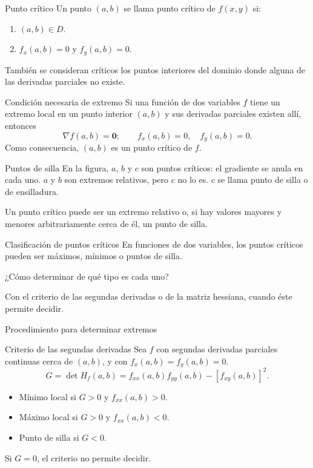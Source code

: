 \documentclass[main.tex]{subfiles}
\begin{document}
\begin{frame}{Punto crítico}
Un punto $(a,b)$ se llama punto crítico de $f(x,y)$ si:
\begin{enumerate}
\item $(a,b)\in D$.
\item $f_x(a,b)=0$ y $f_y(a,b)=0$.
\end{enumerate}
También se consideran críticos los puntos interiores del dominio donde alguna de las derivadas parciales no existe.
\end{frame}
\begin{frame}{Condición necesaria de extremo}
Si una función de dos variables $f$ tiene un extremo local en un punto interior $(a,b)$ y sus derivadas parciales existen allí, entonces
\[\nabla f(a,b)=\mathbf0;\qquad f_x(a,b)=0,\quad f_y(a,b)=0.\]
Como consecuencia, $(a,b)$ es un punto crítico de $f$.
\end{frame}
\begin{frame}{Puntos de silla}
\small En la figura, $a$, $b$ y $c$ son puntos críticos: el gradiente se anula en cada uno. $a$ y $b$ son extremos relativos, pero $c$ no lo es. $c$ se llama punto de silla o de ensilladura.
\medskip

Un punto crítico puede ser un extremo relativo o, si hay valores mayores y menores arbitrariamente cerca de él, un punto de silla.
\end{frame}
\begin{frame}{Clasificación de puntos críticos}
En funciones de dos variables, los puntos críticos pueden ser máximos, mínimos o puntos de silla.
\medskip

¿Cómo determinar de qué tipo es cada uno?
\medskip

Con el criterio de las segundas derivadas o de la matriz hessiana, cuando éste permite decidir.
\end{frame}
\begin{frame}{Procedimiento para determinar extremos}
\end{frame}
\begin{frame}{Criterio de las segundas derivadas}
\small Sea $f$ con segundas derivadas parciales continuas cerca de $(a,b)$, y con $f_x(a,b)=f_y(a,b)=0$.
\[G=\det H_f(a,b)=f_{xx}(a,b)f_{yy}(a,b)-[f_{xy}(a,b)]^2.\]
\begin{itemize}
\item Mínimo local si $G>0$ y $f_{xx}(a,b)>0$.
\item Máximo local si $G>0$ y $f_{xx}(a,b)<0$.
\item Punto de silla si $G<0$.
\end{itemize}
Si $G=0$, el criterio no permite decidir.
\end{frame}
\end{document}
